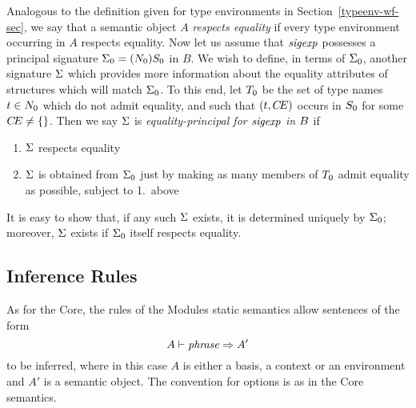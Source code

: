 {Analogous to the definition given for type environments in
Section~\ref{typeenv-wf-sec}, we say that a semantic object $A$
{\sl respects equality} if every type environment occurring in
$A$ respects equality.
%
%
%
\oldpagebreak
Now let us assume that $\sigexp$ possesses a principal signature
$\sig_0=\longsig{0}$ in $B$. We wish to
define, in terms of $\sig_0$, another signature $\sig$ which provides more
information about the equality attributes of structures which will
match $\sig_0$. To this end, let $\T_0$ be the set of type names $\t\in\N_0$
which do not admit equality, and such that $(\t,\CE)$ occurs in $\S_0$
for some $\CE\neq\emptymap$.  Then we say $\sig$ is
{\sl equality-principal for $\sigexp$ in $\B$} if
\begin{enumerate}
\item
$\sig$ respects equality
\item
$\sig$ is obtained from $\sig_0$ just by making as many
members of $\T_0$ admit equality as possible, subject to 1.~above
\end{enumerate}
It is easy to show that, if any such $\sig$ exists, it is determined
uniquely by $\sig_0$; moreover, $\sig$ exists if $\sig_0$ itself
respects equality.
\bigskip}


%

%
\subsection{Inference Rules}
\label{statmod-rules-sec}
As for the Core, the rules of the Modules static semantics allow
sentences of the form
\[ A\ts\phrase\ra A'\]
to be inferred, where in this case $A$ is either a basis, a context or
an environment and $A'$ is a semantic object.  The convention for options
is as in the Core semantics.

